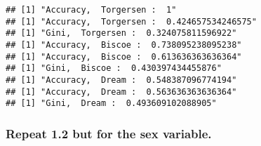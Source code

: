 \documentclass[
]{article}
\newenvironment{Shaded}{\begin{snugshade}}{\end{snugshade}}
\newcommand{\AttributeTok}[1]{\textcolor[rgb]{0.13,0.29,0.53}{#1}}
\newcommand{\CommentTok}[1]{\textcolor[rgb]{0.56,0.35,0.01}{\textit{#1}}}
\newcommand{\ControlFlowTok}[1]{\textcolor[rgb]{0.13,0.29,0.53}{\textbf{#1}}}
\newcommand{\FunctionTok}[1]{\textcolor[rgb]{0.13,0.29,0.53}{\textbf{#1}}}
\newcommand{\NormalTok}[1]{#1}
\newcommand{\OtherTok}[1]{\textcolor[rgb]{0.56,0.35,0.01}{#1}}
\newcommand{\SpecialCharTok}[1]{\textcolor[rgb]{0.81,0.36,0.00}{\textbf{#1}}}
\begin{document}
\begin{verbatim}
## [1] "Accuracy,  Torgersen :  1"
## [1] "Accuracy,  Torgersen :  0.424657534246575"
## [1] "Gini,  Torgersen :  0.324075811596922"
## [1] "Accuracy,  Biscoe :  0.738095238095238"
## [1] "Accuracy,  Biscoe :  0.613636363636364"
## [1] "Gini,  Biscoe :  0.430397434455876"
## [1] "Accuracy,  Dream :  0.548387096774194"
## [1] "Accuracy,  Dream :  0.563636363636364"
## [1] "Gini,  Dream :  0.493609102088905"
\end{verbatim}

\subsubsection{Repeat 1.2 but for the sex
variable.}\label{repeat-1.2-but-for-the-sex-variable.}

\begin{Shaded}
\end{Shaded}
\end{document}

